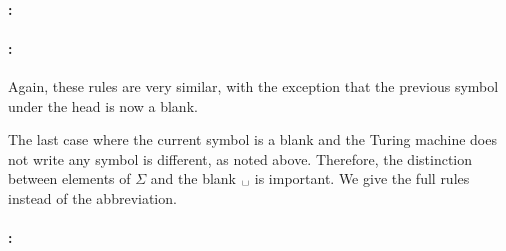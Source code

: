 \paragraph{:}
\begin{center}
  \quad {}
  \quad {}
\end{center}

\paragraph{:}
\begin{center}
  \quad {}
  \quad {}
\end{center}

Again, these rules are very similar, with the exception that the previous symbol under the head is now a blank.

The last case where the current symbol is a blank and the Turing machine does not write any symbol is different, as noted above. Therefore, the distinction between elements of $\Sigma$ and the blank $\blank$ is important. We give the full rules instead of the abbreviation.

\paragraph{:}
\begin{center}
  \quad {}\\
  \quad {} 
  \quad {} \\
  \quad {}
\end{center}

